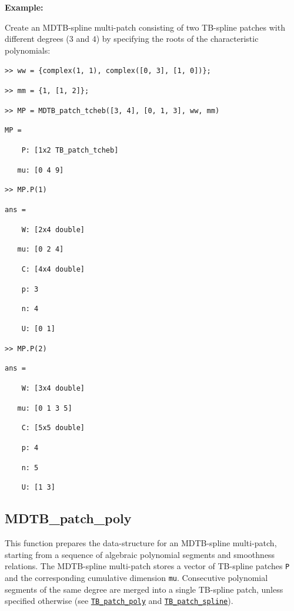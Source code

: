 \documentclass[10pt]{acmtrans2e}
\newenvironment{example}
{\vspace*{0.1cm}
\noindent \textbf{Example:} \vspace*{0.15cm}

\setlength{\parskip}{0.5ex plus 0.5exminus 0.2 ex}
}
{\medskip
}
\begin{document}
\begin{example}
\noindent Create an MDTB-spline multi-patch consisting of two TB-spline patches with different degrees ($3$ and $4$) by specifying the roots of the characteristic polynomials: 
\medskip

\texttt{>> ww = \{complex(1, 1), complex([0, 3], [1, 0])\};}

\texttt{>> mm = \{1, [1, 2]\};}

\texttt{>> MP = MDTB\_patch\_tcheb([3, 4], [0, 1, 3], ww, mm)}

\texttt{MP = }

\texttt{\ \ \ \ P:\ [1x2 TB\_patch\_tcheb]}

\texttt{\ \ \ mu:\ [0 4 9]}

\pagebreak

\texttt{>> MP.P(1)}

\texttt{ans =}

\texttt{\ \ \ \ W:\ [2x4 double]}

\texttt{\ \ \ mu:\ [0 2 4]}

\texttt{\ \ \ \ C:\ [4x4 double]}

\texttt{\ \ \ \ p:\ 3}

\texttt{\ \ \ \ n:\ 4}

\texttt{\ \ \ \ U:\ [0 1]}

\texttt{>> MP.P(2)}

\texttt{ans =}

\texttt{\ \ \ \ W:\ [3x4 double]}

\texttt{\ \ \ mu:\ [0 1 3 5]}

\texttt{\ \ \ \ C:\ [5x5 double]}

\texttt{\ \ \ \ p:\ 4}

\texttt{\ \ \ \ n:\ 5}

\texttt{\ \ \ \ U:\ [1 3]}    
\end{example}


\subsection{MDTB\_patch\_poly} \label{sec:matlab-mdtb-patch-poly}

This function prepares the data-structure for an MDTB-spline multi-patch, starting from a sequence of algebraic polynomial segments and smoothness relations. The MDTB-spline multi-patch stores a vector of TB-spline patches \texttt{P} and the corresponding cumulative dimension \texttt{mu}. Consecutive polynomial segments of the same degree are merged into a single TB-spline patch, unless specified otherwise (see \hyperref[sec:matlab-tb-patch-poly]{\texttt{TB\_patch\_poly}} and \hyperref[sec:matlab-tb-patch-spline]{\texttt{TB\_patch\_spline}}).
\end{document}
